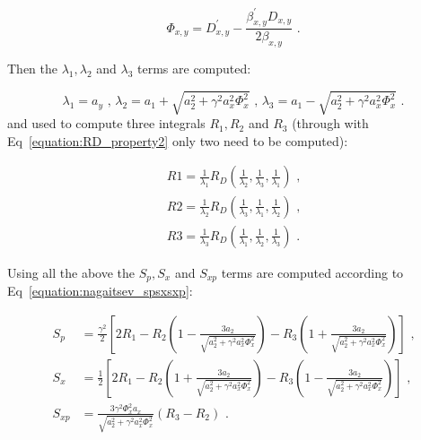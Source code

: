 \begin{equation}
    \Phi_{x,y} = D_{x,y}^{\prime} - \frac{\beta_{x,y}^{\prime} D_{x,y}}{2 \beta_{x,y}} \text{ .}
\end{equation}

Then the \(\lambda_1, \lambda_2\) and \(\lambda_3\) terms are computed:

\begin{equation}
    \lambda_1 = a_y \text{ , }
    \lambda_2 = a_1 + \sqrt{a_2^{2} + \gamma^2 a_x^{2} \Phi_x^2} \text{ , }
    \lambda_3 = a_1 - \sqrt{a_2^{2} + \gamma^2 a_x^{2} \Phi_x^2} \text{ .}
    \label{equation:nagaitsev_lambdas}
\end{equation}
and used to compute three integrals \(R_1, R_2\) and \(R_3\) (through with Eq~\eqref{equation:RD_property2} only two need to be computed):

\begin{equation}
    \begin{aligned}
        R1 = \frac{1}{\lambda_1} R_D(\frac{1}{\lambda_2}, \frac{1}{\lambda_3}, \frac{1}{\lambda_1}) \text{ ,} \\
        R2 = \frac{1}{\lambda_2} R_D(\frac{1}{\lambda_3}, \frac{1}{\lambda_1}, \frac{1}{\lambda_2}) \text{ ,} \\
        R3 = \frac{1}{\lambda_3} R_D(\frac{1}{\lambda_1}, \frac{1}{\lambda_2}, \frac{1}{\lambda_3}) \text{ .}
    \end{aligned}
    \label{equation:nagaitsev_r1r2r3}
\end{equation}

Using all the above the \(S_p, S_x\) and \(S_{xp}\) terms are computed according to Eq~\eqref{equation:nagaitsev_spsxsxp}:

\begin{equation}
    \begin{aligned}
        S_p &= \frac{\gamma^2}{2} \left[ 2 R_1 - R_2 \left(1 - \frac{3 a_2}{\sqrt{a_2^{2} + \gamma^2 a_x^{2} \Phi_x^2}}\right) - R_3 \left(1 + \frac{3 a_2}{\sqrt{a_2^{2} + \gamma^2 a_x^{2} \Phi_x^2}}\right) \right] \text{ ,} \\
        S_x &= \frac{1}{2} \left[ 2 R_1 - R_2 \left(1 + \frac{3 a_2}{\sqrt{a_2^{2} + \gamma^2 a_x^{2} \Phi_x^2}}\right) - R_3 \left(1 - \frac{3 a_2}{\sqrt{a_2^{2} + \gamma^2 a_x^{2} \Phi_x^2}}\right) \right] \text{ ,} \\
        S_{xp} &= \frac{3 \gamma^2 \Phi_x^2 a_x}{\sqrt{a_2^{2} + \gamma^2 a_x^{2} \Phi_x^2}} \left( R_3 - R_2 \right) \text{ .}
    \end{aligned}
    \label{equation:nagaitsev_spsxsxp}
\end{equation}

